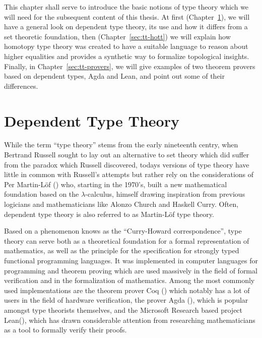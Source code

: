 This chapter shall serve to introduce the basic notions of type theory which
we will need for the subsequent content of this thesis.
At first (Chapter~\ref{sec:tt-dtt}), we will have a general look on dependent type theory, its use and
how it differs from a set theoretic foundation,
then (Chapter~\ref{sec:tt-hott}) we will explain how homotopy type theory was created to have a suitable
language to reason about higher equalities and provides a synthetic way to
formalize topological insights.
Finally, in Chapter~\ref{sec:tt-provers}, we will give examples of two theorem
provers based on dependent types, Agda and Lean, and point out some of their differences.

\section{Dependent Type Theory}\label{sec:tt-dtt}

While the term ``type theory'' stems from the early nineteenth centry, when
Bertrand Russell sought to lay out an alternative to set theory which did
suffer from the paradox which Russell discovered,
todays versions of type theory have little in common with Russell's attempts
but rather rely on the considerations of Per Martin-Löf (\cite{martin-lof2, martin-lof1})
who, starting in the 1970's, built a new mathematical foundation based on the
$\lambda$-calculus, himself drawing inspiration from previous logicians and
mathematicians like Alonzo Church and Haskell Curry.
Often, dependent type theory is also referred to as Martin-Löf type theory.

Based on a phenomenon knows as the ``Curry-Howard correspondence'', type theory
can serve both as a theoretical foundation for a formal representation of mathematics,
as well as the principle for  the specification for strongly typed functional
programming languages.
It was implemented in computer languages for programming and theorem proving which
are used massively in the field of formal verification and in the formalization of
mathematics.
Among the most commonly used implementations are the theorem prover Coq (\cite{coq})
which notably has a lot of users in the field of hardware verification,
the prover Agda (\cite{agda}), which is popular amongst type theorists themselves,
and the Microsoft Research based project Lean(\cite{mouracade}), which has
drawn considerable attention from researching mathematicians as a tool to
formally verify their proofs.

